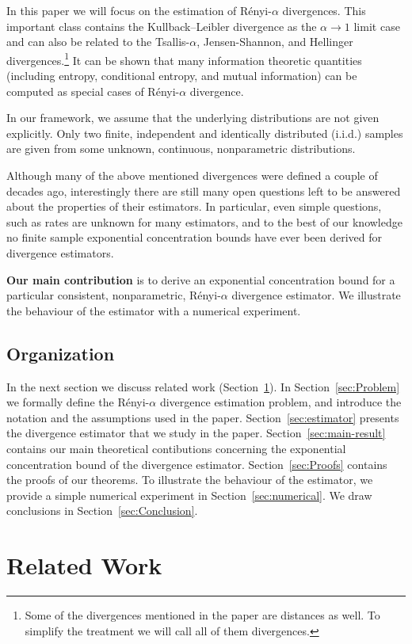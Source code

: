 In this paper we will focus on the estimation of R\'enyi-$\alpha$ divergences.
This important class contains the Kullback--Leibler divergence as the
$\alpha\to 1$ limit case and can also be related to the Tsallis-$\alpha$,
Jensen-Shannon, and Hellinger divergences.\footnote{Some of the divergences
mentioned in the paper are distances as well. To simplify the treatment we will
call all of them divergences.}
It can be shown that many information theoretic quantities
(including entropy, conditional entropy, and mutual information)
can be computed as special cases of R\'enyi-$\alpha$ divergence.

In our framework, we assume that the underlying distributions are not given
explicitly. Only two finite, independent and identically distributed (i.i.d.)
samples are given from some unknown, continuous, nonparametric distributions.

Although many of the above mentioned divergences were
defined a couple of decades ago, interestingly there are still many open
questions left to be answered about the properties of their estimators. In
particular, even simple questions, such as rates are unknown for many
estimators, and to the best of our knowledge no finite sample exponential
concentration bounds have ever been derived for divergence estimators.

\textbf{Our main contribution} is to derive an exponential concentration bound
for a particular consistent, nonparametric, R\'enyi-$\alpha$ divergence
estimator. We illustrate the behaviour of the estimator with a numerical
experiment.

\subsection*{Organization}
In the next section we discuss related work (Section~\ref{sec:related}).
In Section~\ref{sec:Problem} we formally
define the R\'enyi-$\alpha$ divergence estimation problem, and
introduce the notation and the assumptions used in the paper.
Section~\ref{sec:estimator} presents the divergence estimator that we study in
the paper.
Section~\ref{sec:main-result} contains our main theoretical contibutions
concerning the exponential concentration bound of the divergence estimator.
Section~\ref{sec:Proofs} contains the proofs of our theorems.
To illustrate the behaviour of the estimator, we provide a simple numerical
experiment in Section~\ref{sec:numerical}.
We draw conclusions in Section~\ref{sec:Conclusion}.

\section{Related Work} \label{sec:related}

